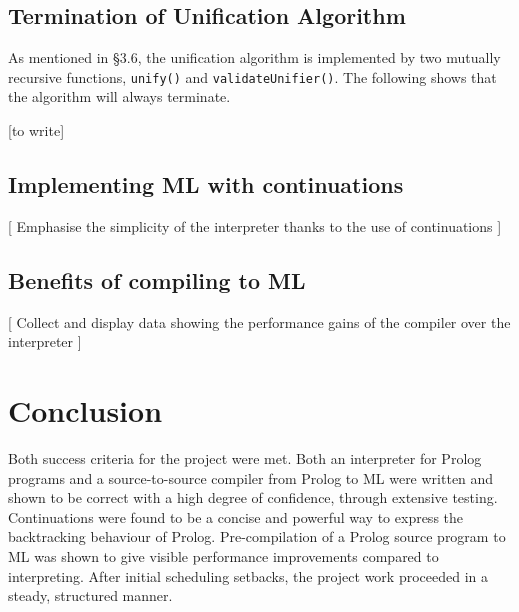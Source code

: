 \documentclass[12pt]{article}
\begin{document}
\subsection{Termination of Unification Algorithm}

As mentioned in \S3.6, the unification algorithm is implemented by two mutually recursive functions, \verb|unify()| and \verb|validateUnifier()|. The following shows that the algorithm will always terminate.

[to write]

\subsection{Implementing ML with continuations}

[ Emphasise the simplicity of the interpreter thanks to the use of continuations ]

\subsection{Benefits of compiling to ML}

[ Collect and display data showing the performance gains of the compiler over the interpreter ]


\newpage

\section{Conclusion}

Both success criteria for the project were met. Both an interpreter for Prolog programs and a source-to-source compiler from Prolog to ML were written and shown to be correct with a high degree of confidence, through extensive testing. Continuations were found to be a concise and powerful way to express the backtracking behaviour of Prolog. Pre-compilation of a Prolog source program to ML was shown to give visible performance improvements compared to interpreting. After initial scheduling setbacks, the project work proceeded in a steady, structured manner. 
\end{document}
